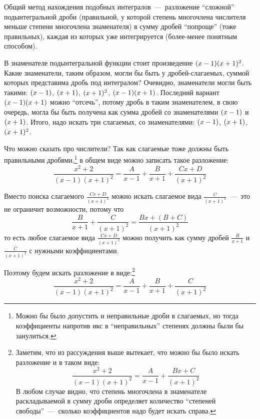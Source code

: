 \documentclass[a4paper,12pt]{article}
\begin{document}
  \begin{solution}
    Общий метод нахождения подобных интегралов~---~разложение ``сложной'' подынтегральной дроби (правильной, у которой степень многочлена числителя меньше степени многочлена знаменателя) в сумму дробей ``попроще'' (тоже правильных), каждая из которых уже интегрируется (более-менее понятным способом).

    В знаменателе подынтегральной функции стоит произведение $(x \hm- 1) (x \hm+ 1)^2$.
    Какие знаменатели, таким образом, могли бы быть у дробей-слагаемых, суммой которых представима дробь под интегралом?
    Очевидно, знаменатели могли быть такими: $(x \hm- 1)$, $(x \hm+ 1)$, $(x \hm+ 1)^2$, $(x \hm- 1)(x \hm+ 1)$.
    Последний вариант $(x \hm- 1)(x \hm+ 1)$ можно ``отсечь'', потому дробь в таким знаменателем, в свою очередь, могла бы быть получена как сумма дробей со знаменателями $(x \hm- 1)$ и $(x \hm+ 1)$.
    Итого, надо искать три слагаемых, со знаменателями: $(x \hm- 1)$, $(x \hm+ 1)$, $(x \hm+ 1)^2$.

    Что можно сказать про числители?
    Так как слагаемые тоже должны быть правильными дробями,\footnote{
      Можно бы было допустить и неправильные дроби в слагаемых, но тогда коэффициенты напротив икс в ``неправильных'' степенях должны были бы занулиться. 
    } в общем виде можно записать такое разложение:
    \[
      \frac{x^2 + 2}{(x - 1) (x + 1)^2} = \frac{A}{x - 1} + \frac{B}{x + 1} + \frac{Cx + D}{(x + 1)^2}
    \]

    Вместо поиска слагаемого $\frac{Cx + D}{(x + 1)^2}$ можно искать слагаемое вида $\frac{C}{(x + 1)^2}$~---~это не ограничит возможности, потому что
    \[
      \frac{B}{x + 1} + \frac{C}{(x + 1)^2} = \frac{Bx + (B + C)}{(x + 1)^2}
    \]
    то есть любое слагаемое вида $\frac{Cx + D}{(x + 1)^2}$ можно получить как сумму дробей $\frac{B}{x + 1}$ и $\frac{C}{(x + 1)^2}$ с нужными коэффициентами.

    Поэтому будем искать разложение в виде:\footnote{
      Заметим, что из рассуждения выше вытекает, что можно бы было искать разложение и в таком виде:
      \[
        \frac{x^2 + 2}{(x - 1) (x + 1)^2} = \frac{A}{x - 1} + \frac{Bx + C}{(x + 1)^2}
      \]
      В любом случае видно, что степень многочлена в знаменателе раскладываемой в сумму дроби определяет количество ``степеней свободы''~---~сколько коэффициентов надо будет искать справа.
    }
    \begin{equation}\label{eq:2-3(2)-finding-fractions}
        \frac{x^2 + 2}{(x - 1) (x + 1)^2} = \frac{A}{x - 1} + \frac{B}{x + 1} + \frac{C}{(x + 1)^2}
    \end{equation}


\end{solution}
\end{document}
